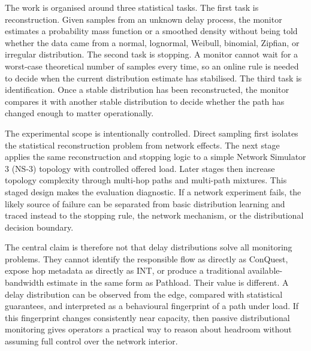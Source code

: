 The work is organised around three statistical tasks. The first task is reconstruction. Given samples from an unknown delay process, the monitor estimates a probability mass function or a smoothed density without being told whether the data came from a normal, lognormal, Weibull, binomial, Zipfian, or irregular distribution. The second task is stopping. A monitor cannot wait for a worst-case theoretical number of samples every time, so an online rule is needed to decide when the current distribution estimate has stabilised. The third task is identification. Once a stable distribution has been reconstructed, the monitor compares it with another stable distribution to decide whether the path has changed enough to matter operationally.

The experimental scope is intentionally controlled. Direct sampling first isolates the statistical reconstruction problem from network effects. The next stage applies the same reconstruction and stopping logic to a simple Network Simulator 3 (NS-3) topology with controlled offered load. Later stages then increase topology complexity through multi-hop paths and multi-path mixtures. This staged design makes the evaluation diagnostic. If a network experiment fails, the likely source of failure can be separated from basic distribution learning and traced instead to the stopping rule, the network mechanism, or the distributional decision boundary.

The central claim is therefore not that delay distributions solve all monitoring problems. They cannot identify the responsible flow as directly as ConQuest, expose hop metadata as directly as INT, or produce a traditional available-bandwidth estimate in the same form as Pathload. Their value is different. A delay distribution can be observed from the edge, compared with statistical guarantees, and interpreted as a behavioural fingerprint of a path under load. If this fingerprint changes consistently near capacity, then passive distributional monitoring gives operators a practical way to reason about headroom without assuming full control over the network interior.
